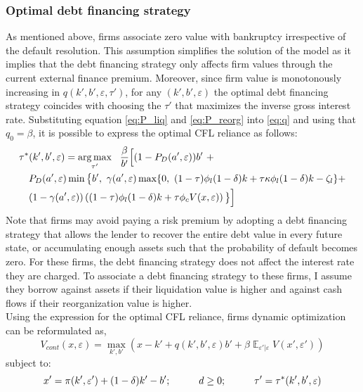 \documentclass[12pt]{article}
\DeclareMathOperator{\E}{\mathbb{E}}
\DeclareMathOperator*{\argmax}{arg\,max}
\begin{document}
\subsubsection{Optimal debt financing strategy}
As mentioned above, firms associate zero value with bankruptcy irrespective of the default resolution. This assumption simplifies the solution of the model as it implies that the debt financing strategy only affects firm values through the current external finance premium. Moreover, since firm value is monotonously increasing in $q(k',b',\varepsilon, \tau')$, for any $(k',b',\varepsilon)$ the optimal debt financing strategy coincides with choosing the $\tau'$ that maximizes the inverse gross interest rate. Substituting equation \ref{eq:P_liq} and \ref{eq:P_reorg} into \ref{eq:q} and using that $q_0 = \beta$, it is possible to express the optimal CFL reliance as follows:
\begin{equation} \label{eq:opt_tau}
    \begin{split}
        & \tau^*(k',b',\varepsilon) = \argmax_{\tau'} \ \  \frac{\beta}{b'} \Big{[} (1-P_D(a', \varepsilon))b' \ +  \\
        & \quad  P_D(a', \varepsilon) \min \big{\{} b', \ \gamma(a',\varepsilon) \max \{0, \ (1-\tau) \phi_l (1-\delta) k +\tau \kappa \phi_l  (1-\delta) k - \zeta_l \} +  \\
        & \quad (1-\gamma(a',\varepsilon)) \left(  (1-\tau) \phi_l (1-\delta) k +\tau \phi_c V (x, \varepsilon) \right) \big{\}} \Big{]} 
    \end{split}
 \end{equation}
Note that firms may avoid paying a risk premium by adopting a debt financing strategy that allows the lender to recover the entire debt value in every future state, or accumulating enough assets such that the probability of default becomes zero. For these firms, the debt financing strategy does not affect the interest rate they are charged. To associate a debt financing strategy to these firms, I assume they borrow against assets if their liquidation value is higher and against cash flows if their reorganization value is higher. \vspace{3mm} \\
Using the expression for the optimal CFL reliance, firms dynamic optimization can be reformulated as, 
    \begin{equation} 
        V_{cont}(x,\varepsilon) = \max_{k',b'} \left(x - k' +  q(k',b',\varepsilon)b' + \beta \E_{\varepsilon'|\varepsilon} V(x',\varepsilon') \right)
    \end{equation}
    subject to: 
    \begin{equation} \label{eq:cont_1}
    x' = \pi(k',\varepsilon')+(1-\delta)k'-b'; \hspace{10mm} d \geq 0;  \hspace{10mm} \tau' = \tau^*(k',b',\varepsilon)
    \end{equation}
\end{document}
